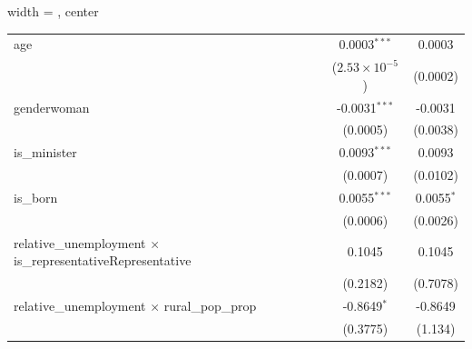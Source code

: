 \begin{adjustbox}{width = \textwidth, center}
\begin{tabular}{lcc}
      age                                                                                                                                            & 0.0003$^{***}$          & 0.0003\\   
                                                                                                                                                     & ($2.53\times 10^{-5}$)  & (0.0002)\\   
      genderwoman                                                                                                                                    & -0.0031$^{***}$         & -0.0031\\   
                                                                                                                                                     & (0.0005)                & (0.0038)\\   
      is\_minister                                                                                                                                   & 0.0093$^{***}$          & 0.0093\\   
                                                                                                                                                     & (0.0007)                & (0.0102)\\   
      is\_born                                                                                                                                       & 0.0055$^{***}$          & 0.0055$^{*}$\\   
                                                                                                                                                     & (0.0006)                & (0.0026)\\   
      relative\_unemployment $\times$ is\_representativeRepresentative                                                                               & 0.1045                  & 0.1045\\   
                                                                                                                                                     & (0.2182)                & (0.7078)\\   
      relative\_unemployment $\times$ rural\_pop\_prop                                                                                               & -0.8649$^{*}$           & -0.8649\\   
                                                                                                                                                     & (0.3775)                & (1.134)\\   

\end{tabular}
\end{adjustbox}
